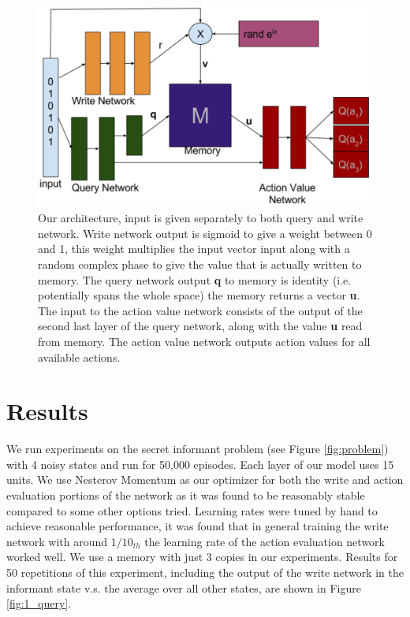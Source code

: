 \documentclass{article}
\begin{document}
\begin{figure}[!ht]
\includegraphics[width=1\textwidth]{images/architecture.png}
\caption{Our architecture, input is given separately to both query and write network. Write network output is sigmoid to give a weight between 0 and 1, this weight multiplies the input vector input along with a random complex phase to give the value that is actually written to memory. The query network output \textbf{q} to memory is identity (i.e. potentially spans the whole space) the memory returns a vector \textbf{u}. The input to the action value network consists of the output of the second last layer of the query network, along with the value \textbf{u} read from memory. The action value network outputs action values for all available actions.  }
\label{fig:arch}
\end{figure}

\section*{Results}
We run experiments on the secret informant problem (see Figure \ref{fig:problem}) with 4 noisy states and run for 50,000 episodes. Each layer of our model uses 15 units. We use Nesterov Momentum as our optimizer for both the write and action evaluation portions of the network as it was found to be reasonably stable compared to some other options tried. Learning rates were tuned by hand to achieve reasonable performance, it was found that in general training the write network with around $1/10_{th}$ the learning rate of the action evaluation network worked well. We use a memory with just 3 copies in our experiments. Results for 50 repetitions of this experiment, including the output of the write network in the informant state v.s. the average over all other states, are shown in Figure \ref{fig:1_query}.
\end{document}
